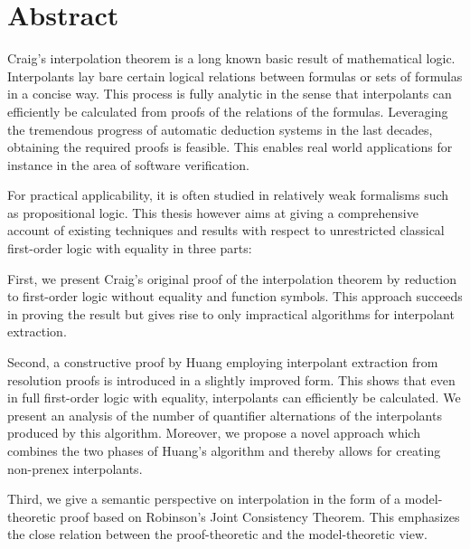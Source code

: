 \chapter*{Abstract}

Craig's interpolation theorem is a long known basic result of mathematical logic.
Interpolants lay bare certain logical relations between formulas or sets of formulas in a
concise way.
This process is fully analytic in the sense that interpolants can efficiently
be calculated from proofs of the relations of the formulas. Leveraging the tremendous
progress of automatic deduction systems in the last decades, obtaining the required proofs
is feasible. 
This enables real world applications for instance in the area of software verification.

For practical applicability, it is often studied in relatively weak formalisms such as propositional logic.
This thesis however aims at giving a comprehensive account of existing techniques and results with respect to unrestricted classical first-order logic with equality in three parts:

First, we present Craig's original proof of the interpolation theorem by reduction to first-order logic without equality and function symbols.
This approach succeeds in proving the result but gives rise to only impractical algorithms for interpolant extraction.

Second, a constructive proof by Huang employing interpolant extraction from resolution proofs is introduced in a slightly improved form.
This shows that even in full first-order logic with equality, interpolants can efficiently be calculated.
We present an analysis of the number of quantifier alternations of the interpolants produced by this algorithm.
Moreover, we propose a novel approach which combines the two phases of Huang's algorithm and thereby allows for creating non-prenex interpolants.

Third, we give a semantic perspective on interpolation in the form of a model-theoretic proof based on Robinson's Joint Consistency Theorem.
This emphasizes the close relation between the proof-theoretic and the model-theoretic view.






%
%
%
%
%
%
%
%
%
%
%
%
%
%
%
%
%
